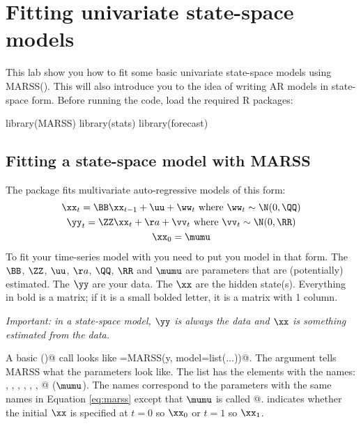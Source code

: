 

\chapter{Fitting univariate state-space models}
\label{chap:univariate state-space}


This lab show you how to fit some basic univariate state-space models using MARSS(). This will also introduce you to the idea of writing AR models in state-space form.  Before running the code, load the required R packages:
\begin{Schunk}
\begin{Sinput}
 library(MARSS)
 library(stats)
 library(forecast)
\end{Sinput}
\end{Schunk}


\section{Fitting a state-space model with MARSS}
The \verb@MARSS@ package fits multivariate auto-regressive models of this form:
\begin{equation}
\begin{gathered}
\xx_t = \BB \xx_{t-1}+\uu+\ww_t \text{ where } \ww_t \sim \N(0,\QQ) \\
\yy_t = \ZZ\xx_t+\aa+\vv_t \text{ where } \vv_t \sim \N(0,\RR) \\
\xx_0 = \mumu
\end{gathered}   
\label{eq:marss}
\end{equation}
To fit your time-series model with \verb@MARSS@ you need to put you model in that form.  The $\BB$, $\ZZ$, $\uu$, $\aa$, $\QQ$, $\RR$ and $\mumu$ are parameters that are (potentially) estimated. The $\yy$ are your data.  The $\xx$ are the hidden state(s).  Everything in bold is a matrix; if it is a small bolded letter, it is a matrix with 1 column.

{\it Important: in a state-space model, $\yy$ is always the data and $\xx$ is something estimated from the data.}

A basic \verb@MARSS()@ call looks like
\verb@fit=MARSS(y, model=list(...))@.
The \verb@model@ argument tells MARSS what the parameters look like.  The list has the elements with the names: \verb@B@, \verb@U@, \verb@Q@, \verb@Z@, \verb@A@, \verb@R@, @ ($\mumu$).  The names correspond to the parameters with the same names in Equation \ref{eq:marss} except that $\mumu$ is called @. \verb@tinitx@ indicates whether the initial $\xx$ is specified at $t=0$ so $\xx_0$ or $t=1$ so $\xx_1$.

